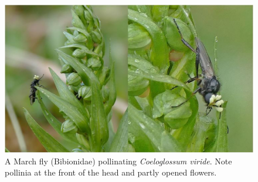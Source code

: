 \begin{multicols}{2}
\begin{figure}[H]
\begin{center}
\vspace{2mm}
\includegraphics[width=\textwidth]{img/Bibionidae.jpg}
\caption{A March fly (Bibionidae) pollinating \emph{Coeloglossum viride}.  Note pollinia at the front of the head and partly opened flowers.}
\label{Bibionidae}
\end{center}
\end{figure}





\end{multicols}
